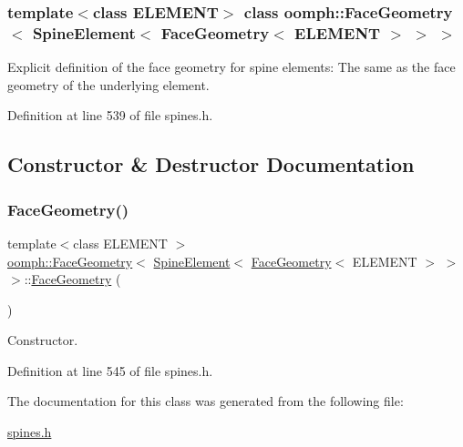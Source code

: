 \subsubsection*{template$<$class E\+L\+E\+M\+E\+NT$>$\newline
class oomph\+::\+Face\+Geometry$<$ Spine\+Element$<$ Face\+Geometry$<$ E\+L\+E\+M\+E\+N\+T $>$ $>$ $>$}

Explicit definition of the face geometry for spine elements\+: The same as the face geometry of the underlying element. 

Definition at line 539 of file spines.\+h.



\subsection{Constructor \& Destructor Documentation}
\mbox{\label{classoomph_1_1FaceGeometry_3_01SpineElement_3_01FaceGeometry_3_01ELEMENT_01_4_01_4_01_4_af985d26706328d84f9d381ba1c8c5224}} 
\subsubsection{\texorpdfstring{Face\+Geometry()}{FaceGeometry()}}
{\footnotesize\ttfamily template$<$class E\+L\+E\+M\+E\+NT $>$ \\
\hyperlink{classoomph_1_1FaceGeometry}{oomph\+::\+Face\+Geometry}$<$ \hyperlink{classoomph_1_1SpineElement}{Spine\+Element}$<$ \hyperlink{classoomph_1_1FaceGeometry}{Face\+Geometry}$<$ E\+L\+E\+M\+E\+NT $>$ $>$ $>$\+::\hyperlink{classoomph_1_1FaceGeometry}{Face\+Geometry} (\begin{DoxyParamCaption}{ }\end{DoxyParamCaption})\hspace{0.3cm}{\ttfamily [inline]}}



Constructor. 



Definition at line 545 of file spines.\+h.



The documentation for this class was generated from the following file\+:\begin{DoxyCompactItemize}
\item 
\hyperlink{spines_8h}{spines.\+h}\end{DoxyCompactItemize}
